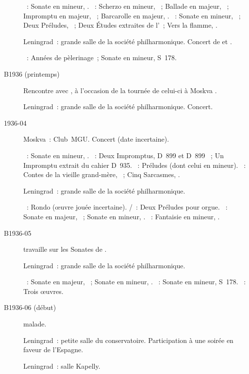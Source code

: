 \begin{description}
 \textsc{\Schumann{}}~: Sonate en \kF \Sharp mineur, .
 \textsc{\Chopin{}}~: Scherzo en \kB \Flat mineur, ~; Ballade en
 \kA \Flat majeur, ~; Impromptu en \kG \Flat majeur, ~;
 Barcarolle en \kF \Sharp majeur, .
 \textsc{\Scriabine{}}~: Sonate en \kF \Sharp mineur, ~; Deux
 Préludes, ~; Deux Études extraites de l'~; Vers la
 flamme, .
 \item[\DateWithWeekDay{1936-03-11}]
 Leningrad~: grande salle de la société philharmonique.
 Concert de \IBraudo{} et \VSofronitsky{}.

 \textsc{\Liszt{}}~: Années de pèlerinage~; Sonate en \kB mineur, S~178.
 \item[B1936 (printemps)]
 Rencontre avec \ACortot{}, à l'occasion de la tournée de celui-ci à Moskva
 \citep[p.~101]{Nikonovich08a}.
 \item[\DateWithWeekDay{1936-03-27}]
 Leningrad~: grande salle de la société philharmonique.
 Concert.
 \item[1936-04]
 Moskva~: Club~MGU.
 Concert (date incertaine).

 \textsc{\Beethoven{}}~: Sonate en \kF mineur, .
 \textsc{\Schubert{}}~: Deux Impromptus, D~899  et D~899
 ~; Un Impromptu extrait du cahier D~935.
 \textsc{\Chostakovitch{}}~: Préludes (dont celui en \kC \Sharp mineur).
 \textsc{\Prokofiev{}}~: Contes de la vieille grand-mère, ~; Cinq
 Sarcasmes, .
 \item[\DateWithWeekDay{1936-04-09}]
 Leningrad~: grande salle de la société philharmonique.

 \textsc{\CBach{}}~: Rondo (œuvre jouée incertaine).
 \textsc{\JBach{}/\Ziloti{}}~: Deux Préludes pour orgue.
 \textsc{\Beethoven{}}~: Sonate en \kD majeur,  ~; Sonate
 en \kC mineur, .
 \textsc{\Chopin{}}~: Fantaisie en \kF mineur, .
 \item[B1936-05]
 \VSofronitsky{} travaille sur les Sonates de \Beethoven{} .
 \item[\DateWithWeekDay{1936-05-25}]
 Leningrad~: grande salle de la société philharmonique.

 \textsc{\Beethoven{}}~: Sonate en \kD majeur, ~; Sonate en \kF
 mineur, .
 \textsc{\Liszt{}}~: Sonate en \kB mineur, S~178.
 \textsc{\Debussy{}}~: Trois œuvres.
 \item[B1936-06 (début)]
 \VSofronitsky{} malade.
 \item[\DateWithWeekDay{1936-06-15}]
 Leningrad~: petite salle du conservatoire.
 Participation à une soirée en faveur de l'\hbox{Espagne}.
 \item[\DateWithWeekDay{1936-06-26}]
 Leningrad~: salle Kapelly.


\end{description}
